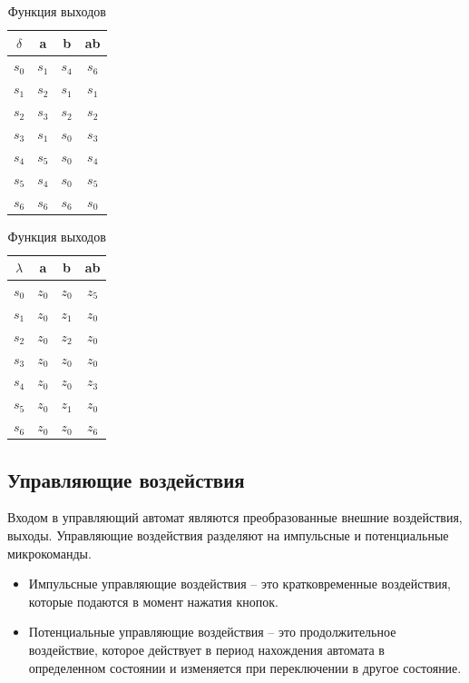 \documentclass[10pt,a4paper,final]{article} %
\begin{document}
\begin{table}[h!]
	\centering
	\begin{minipage}{0.45\textwidth}
		\centering
		\begin{tabular}{|c|c c c|}
			\hline
			$\delta$ & a & b & ab \\
			\hline
			$s_0$ & $s_1$ & $s_4$ & $s_6$ \\ 
			$s_1$ & $s_2$ & $s_1$ & $s_1$ \\ 
			$s_2$ & $s_3$ & $s_2$ & $s_2$ \\ 
			$s_3$ & $s_1$ & $s_0$ & $s_3$ \\ 
			$s_4$ & $s_5$ & $s_0$ & $s_4$ \\ 
			$s_5$ & $s_4$ & $s_0$ & $s_5$ \\ 
			$s_6$ & $s_6$ & $s_6$ & $s_0$ \\ 
			\hline
		\end{tabular}
		\caption{Функция переходов}
	\end{minipage}
	\hfill
	\begin{minipage}{0.45\textwidth}
		\centering
		\begin{tabular}{|c|c c c|}
			\hline
			$\lambda$ & a & b & ab \\
			\hline
			$s_0$ & $z_0$ & $z_0$ & $z_5$ \\ 
			$s_1$ & $z_0$ & $z_1$ & $z_0$ \\ 
			$s_2$ & $z_0$ & $z_2$ & $z_0$ \\ 
			$s_3$ & $z_0$ & $z_0$ & $z_0$ \\ 
			$s_4$ & $z_0$ & $z_0$ & $z_3$ \\ 
			$s_5$ & $z_0$ & $z_1$ & $z_0$ \\  
			$s_6$ & $z_0$ & $z_0$ & $z_6$ \\ 
			\hline
		\end{tabular}
		\caption{Функция выходов}
	\end{minipage}
	\label{func}
\end{table}


\subsection{Управляющие воздействия}
Входом в управляющий автомат являются преобразованные внешние воздействия, выходы. Управляющие воздействия разделяют на импульсные и потенциальные микрокоманды.
\begin{itemize}
	\item Импульсные управляющие воздействия -- это кратковременные воздействия, которые подаются в момент нажатия кнопок.
	\item Потенциальные управляющие воздействия -- это продолжительное воздействие, которое действует в период нахождения автомата в определенном состоянии и изменяется при переключении в другое состояние.
\end{itemize}
\end{document}
